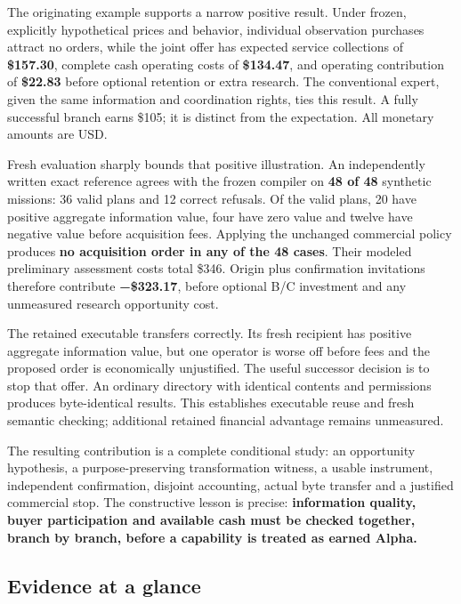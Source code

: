\documentclass[11pt,letterpaper]{article}
\begin{document}
The originating example supports a narrow positive result. Under frozen,
explicitly hypothetical prices and behavior, individual observation
purchases attract no orders, while the joint offer has expected service
collections of \textbf{\$157.30}, complete cash operating costs of
\textbf{\$134.47}, and operating contribution of \textbf{\$22.83} before
optional retention or extra research. The conventional expert, given the
same information and coordination rights, ties this result. A fully
successful branch earns \$105; it is distinct from the expectation. All
monetary amounts are USD.

Fresh evaluation sharply bounds that positive illustration. An
independently written exact reference agrees with the frozen compiler on
\textbf{48 of 48} synthetic missions: 36 valid plans and 12 correct
refusals. Of the valid plans, 20 have positive aggregate information
value, four have zero value and twelve have negative value before
acquisition fees. Applying the unchanged commercial policy produces
\textbf{no acquisition order in any of the 48 cases}. Their modeled
preliminary assessment costs total \$346. Origin plus confirmation
invitations therefore contribute \textbf{−\$323.17}, before optional B/C
investment and any unmeasured research opportunity cost.

The retained executable transfers correctly. Its fresh recipient has
positive aggregate information value, but one operator is worse off
before fees and the proposed order is economically unjustified. The
useful successor decision is to stop that offer. An ordinary directory
with identical contents and permissions produces byte-identical results.
This establishes executable reuse and fresh semantic checking;
additional retained financial advantage remains unmeasured.

The resulting contribution is a complete conditional study: an
opportunity hypothesis, a purpose-preserving transformation witness, a
usable instrument, independent confirmation, disjoint accounting, actual
byte transfer and a justified commercial stop. The constructive lesson
is precise: \textbf{information quality, buyer participation and
available cash must be checked together, branch by branch, before a
capability is treated as earned Alpha.}

\hypertarget{evidence-at-a-glance}{%
\subsection{Evidence at a glance}\label{evidence-at-a-glance}}
\end{document}
